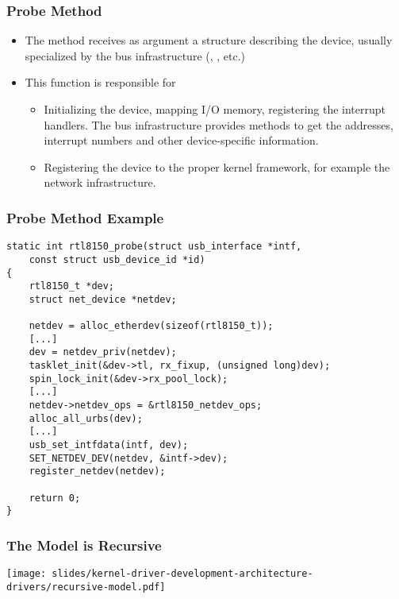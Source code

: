 \begin{frame}
  \frametitle{Probe Method}
  \begin{itemize}
  \item The  method receives as argument a structure
    describing the device, usually specialized by the bus
    infrastructure (, , etc.)
  \item This function is responsible for
    \begin{itemize}
    \item Initializing the device, mapping I/O memory, registering the
      interrupt handlers. The bus infrastructure provides methods to
      get the addresses, interrupt numbers and other device-specific
      information.
    \item Registering the device to the proper kernel framework, for
      example the network infrastructure.
    \end{itemize}
  \end{itemize}
\end{frame}

\begin{frame}[fragile]
\frametitle{Probe Method Example}
\begin{verbatim}
static int rtl8150_probe(struct usb_interface *intf,
    const struct usb_device_id *id)
{
    rtl8150_t *dev;
    struct net_device *netdev;

    netdev = alloc_etherdev(sizeof(rtl8150_t));
    [...]
    dev = netdev_priv(netdev);
    tasklet_init(&dev->tl, rx_fixup, (unsigned long)dev);
    spin_lock_init(&dev->rx_pool_lock);
    [...]
    netdev->netdev_ops = &rtl8150_netdev_ops;
    alloc_all_urbs(dev);
    [...]
    usb_set_intfdata(intf, dev);
    SET_NETDEV_DEV(netdev, &intf->dev);
    register_netdev(netdev);

    return 0;
}
\end{verbatim}
\end{frame}

\begin{frame}
  \frametitle{The Model is Recursive}
  \begin{center}
    \texttt{[image: slides/kernel-driver-development-architecture-drivers/recursive-model.pdf]}
  \end{center}
\end{frame}

